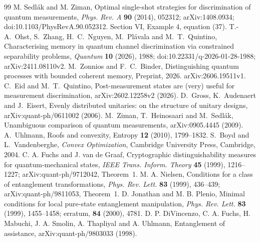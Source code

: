\begin{thebibliography}{99}
 M. Sedl\'ak and M. Ziman,
Optimal single-shot strategies for discrimination of quantum measurements,
\emph{Phys. Rev. A} \textbf{90} (2014), 052312;
arXiv:1408.0934; doi:10.1103/PhysRevA.90.052312.
Section VI, Example 4, equation (37).
 T.-A.~Ohst, S.~Zhang, H.~C.~Nguyen,
M.~Pl\'avala and M.~T.~Quintino,
Characterising memory in quantum channel discrimination via
constrained separability problems,
\emph{Quantum} \textbf{10} (2026), 1988;
doi:10.22331/q-2026-01-28-1988; arXiv:2411.08110v2.
 M.~Zonnios and F.~C.~Binder,
Distinguishing quantum processes with bounded coherent memory,
Preprint, 2026. arXiv:2606.19511v1.
 C.~Eid and M.~T.~Quintino,
Post-measurement states are (very) useful for measurement discrimination,
arXiv:2602.12258v2 (2026).
 D.~Gross, K.~Audenaert and J.~Eisert,
Evenly distributed unitaries: on the structure of unitary designs,
arXiv:quant-ph/0611002 (2006).
 M.~Ziman, T.~Heinosaari and M.~Sedl\'ak,
Unambiguous comparison of quantum measurements,
arXiv:0905.4445 (2009).
 A.~Uhlmann, Roofs and convexity,
Entropy \textbf{12} (2010), 1799--1832.
 S.~Boyd and L.~Vandenberghe, \emph{Convex Optimization},
Cambridge University Press, Cambridge, 2004.
 C. A. Fuchs and J. van de Graaf,
Cryptographic distinguishability measures for quantum-mechanical states,
\emph{IEEE Trans. Inform. Theory} \textbf{45} (1999), 1216--1227;
arXiv:quant-ph/9712042, Theorem~1.
 M. A. Nielsen,
Conditions for a class of entanglement transformations,
\emph{Phys. Rev. Lett.} \textbf{83} (1999), 436--439;
arXiv:quant-ph/9811053, Theorem~1.
 D. Jonathan and M. B. Plenio,
Minimal conditions for local pure-state entanglement manipulation,
\emph{Phys. Rev. Lett.} \textbf{83} (1999), 1455--1458;
erratum, \textbf{84} (2000), 4781.
 D. P. DiVincenzo, C. A. Fuchs, H. Mabuchi,
J. A. Smolin, A. Thapliyal and A. Uhlmann,
Entanglement of assistance, arXiv:quant-ph/9803033 (1998).
\end{thebibliography}
